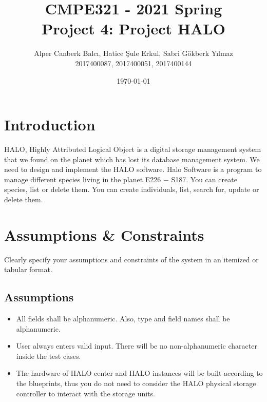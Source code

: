 \documentclass{article}
\title{CMPE321 - 2021 Spring \\ Project 4: Project HALO}
\date{\today}
\author{Alper Canberk Balcı, Hatice Şule Erkul, Sabri Gökberk Yılmaz \\ 2017400087, 2017400051, 2017400144}
\begin{document}
\maketitle
\newpage
\tableofcontents
\newpage
\section{Introduction}
\label{sec:introduction}
HALO, Highly Attributed
Logical Object is a digital storage management system that we found on the planet which has lost its database management system. We need to design and implement the HALO software. Halo Software is a program to manage different species living in the planet E226 − S187. You can create species, list or delete them. You can create individuals, list, search for, update or delete them.
\section{Assumptions \& Constraints}
\label{sec:ass-and-const}
Clearly specify your assumptions and constraints of the system in an itemized or tabular format. 
\subsection{Assumptions}
\begin{itemize}
    \item All fields shall be alphanumeric. Also, type and field names shall be alphanumeric.
    \item User always enters valid input. There will be no non-alphanumeric character inside the test cases.
    \item The hardware of HALO center and HALO instances will be built according to the blueprints, thus you
do not need to consider the HALO physical storage controller to interact with the storage units.
    
\end{itemize}
\end{document}
